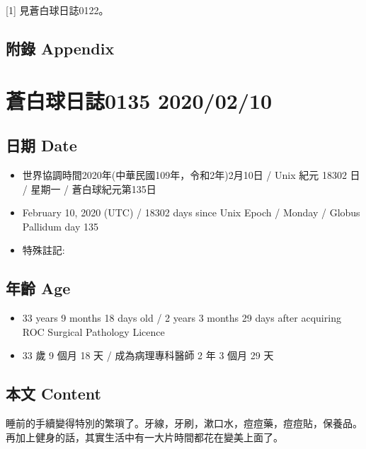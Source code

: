 \documentclass[a5paper, 12pt
]{book}
\providecommand{\tightlist}{%
  \setlength{\itemsep}{0pt}\setlength{\parskip}{0pt}}
\begin{document}
{[}1{]} 見蒼白球日誌0122。

\hypertarget{ux9644ux9304-appendix-70}{%
\subsection{附錄 Appendix}\label{ux9644ux9304-appendix-70}}

\hypertarget{ux84bcux767dux7403ux65e5ux8a8c0135-20200210}{%
\section{蒼白球日誌0135
2020/02/10}\label{ux84bcux767dux7403ux65e5ux8a8c0135-20200210}}

\hypertarget{ux65e5ux671f-date-71}{%
\subsection{日期 Date}\label{ux65e5ux671f-date-71}}

\begin{itemize}
\tightlist
\item
  世界協調時間2020年(中華民國109年，令和2年)2月10日 / Unix 紀元 18302 日
  / 星期一 / 蒼白球紀元第135日
\item
  February 10, 2020 (UTC) / 18302 days since Unix Epoch / Monday /
  Globus Pallidum day 135
\item
  特殊註記:
\end{itemize}

\hypertarget{ux5e74ux9f61-age-71}{%
\subsection{年齡 Age}\label{ux5e74ux9f61-age-71}}

\begin{itemize}
\tightlist
\item
  33 years 9 months 18 days old / 2 years 3 months 29 days after
  acquiring ROC Surgical Pathology Licence
\item
  33 歲 9 個月 18 天 / 成為病理專科醫師 2 年 3 個月 29 天
\end{itemize}

\hypertarget{ux672cux6587-content-71}{%
\subsection{本文 Content}\label{ux672cux6587-content-71}}

睡前的手續變得特別的繁瑣了。牙線，牙刷，漱口水，痘痘藥，痘痘貼，保養品。再加上健身的話，其實生活中有一大片時間都花在變美上面了。
\end{document}

